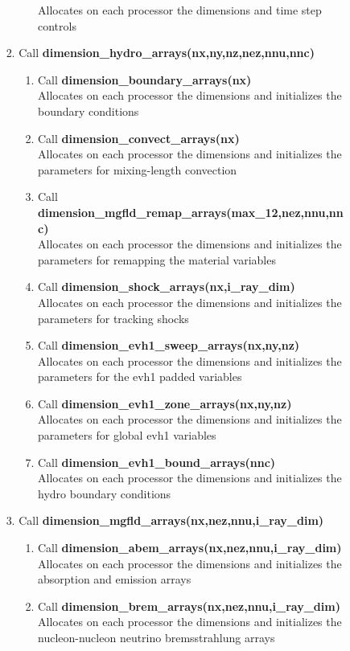 \documentclass[11pt,doublespace]{article}
\begin{document}
\begin{itemize}
\begin{enumerate}
\begin{enumerate}
\begin{enumerate}
\begin{enumerate}
    Allocates on each processor  the dimensions and time step controls
\end{enumerate}
  \item Call {\bf dimension\_hydro\_arrays(nx,ny,nz,nez,nnu,nnc)}
\begin{enumerate}
  \item Call {\bf dimension\_boundary\_arrays(nx)}\\
  Allocates on each processor  the dimensions and initializes the boundary conditions
  \item Call {\bf dimension\_convect\_arrays(nx)}\\
  Allocates on each processor  the dimensions and initializes the parameters for mixing-length convection
  \item Call {\bf dimension\_mgfld\_remap\_arrays(max\_12,nez,nnu,nnc)}\\
  Allocates on each processor  the dimensions and initializes the parameters for remapping the material variables
  \item Call {\bf dimension\_shock\_arrays(nx,i\_ray\_dim)}\\
  Allocates on each processor  the dimensions and initializes the parameters for tracking shocks
  \item Call {\bf dimension\_evh1\_sweep\_arrays(nx,ny,nz)}\\
  Allocates on each processor  the dimensions and initializes the parameters for the evh1 padded variables
  \item Call {\bf dimension\_evh1\_zone\_arrays(nx,ny,nz)}\\
  Allocates on each processor  the dimensions and initializes the parameters for global evh1 variables
  \item Call {\bf dimension\_evh1\_bound\_arrays(nnc)}\\
  Allocates on each processor  the dimensions and initializes the hydro boundary conditions
\end{enumerate}
  \item Call {\bf dimension\_mgfld\_arrays(nx,nez,nnu,i\_ray\_dim)}
\begin{enumerate}
  \item Call {\bf dimension\_abem\_arrays(nx,nez,nnu,i\_ray\_dim)}\\
    Allocates on each processor  the dimensions and initializes the absorption and emission arrays
  \item Call {\bf dimension\_brem\_arrays(nx,nez,nnu,i\_ray\_dim)}\\
    Allocates on each processor  the dimensions and initializes the nucleon-nucleon neutrino bremsstrahlung arrays

\end{enumerate}
\end{enumerate}
\end{enumerate}
\end{enumerate}
\end{itemize}
\end{document}
